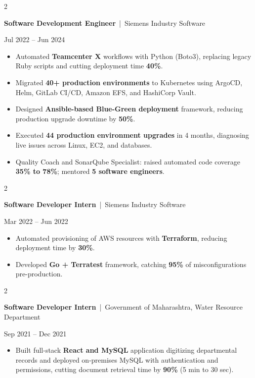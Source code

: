 \documentclass[10pt, letterpaper]{article}
\newenvironment{highlights}{
    \begin{itemize}[
        topsep=0.10 cm,
        parsep=0.06 cm,
        partopsep=0pt,
        itemsep=0.06 cm,
        leftmargin=12pt
    ]
}{
    \end{itemize}
}
\newenvironment{twocolentry}[2][]{
    \onecolentry
    \def\secondColumn{#2}
    \setcolumnwidth{\fill, 4.5 cm}
    \begin{paracol}{2}
}{
    \switchcolumn \raggedleft \secondColumn
    \end{paracol}
    \endonecolentry
}
\begin{document}
\begin{twocolentry}{Jul 2022 -- Jun 2024}
\textbf{Software Development Engineer} \,|\, Siemens Industry Software
\end{twocolentry}
\begin{highlights}
  \item Automated \textbf{Teamcenter X} workflows with Python (Boto3), replacing legacy Ruby scripts and cutting deployment time \textbf{40\%}.
  \item Migrated \textbf{40+ production environments} to Kubernetes using ArgoCD, Helm, GitLab CI/CD, Amazon EFS, and HashiCorp Vault.
  \item Designed \textbf{Ansible-based Blue-Green deployment} framework, reducing production upgrade downtime by \textbf{50\%}.
  \item Executed \textbf{44 production environment upgrades} in 4 months, diagnosing live issues across Linux, EC2, and databases.
  \item Quality Coach and SonarQube Specialist: raised automated code coverage \textbf{35\% to 78\%}; mentored \textbf{5 software engineers}.
\end{highlights}
\vspace{0.15 cm}

\begin{twocolentry}{Mar 2022 -- Jun 2022}
\textbf{Software Developer Intern} \,|\, Siemens Industry Software
\end{twocolentry}
\begin{highlights}
  \item Automated provisioning of AWS resources with \textbf{Terraform}, reducing deployment time by \textbf{30\%}.
  \item Developed \textbf{Go + Terratest} framework, catching \textbf{95\%} of misconfigurations pre-production.
\end{highlights}
\vspace{0.15 cm}

\begin{twocolentry}{Sep 2021 -- Dec 2021}
\textbf{Software Developer Intern} \,|\, Government of Maharashtra, Water Resource Department
\end{twocolentry}
\begin{highlights}
  \item Built full-stack \textbf{React and MySQL} application digitizing departmental records and deployed on-premises MySQL with authentication and permissions, cutting document retrieval time by \textbf{90\%} (5 min to 30 sec).
\end{highlights}
\vspace{0.07 cm}
\end{document}
